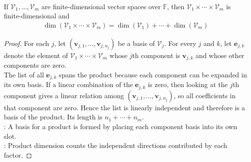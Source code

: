 \begin{theorem} \label{thm:dimension-of-product} \\
If $\mathcal{V}_1,\ldots,\mathcal{V}_m$ are finite-dimensional vector spaces over $\mathbb{F}$, then $\mathcal{V}_1\times\cdots\times\mathcal{V}_m$ is finite-dimensional and
\begin{align}
\dim(\mathcal{V}_1\times\cdots\times\mathcal{V}_m) = \dim(\mathcal{V}_1)+\cdots+\dim(\mathcal{V}_m) \nonumber
\end{align}
\begin{proof}
For each $j$, let $(\mathbf{v}_{j,1},\ldots,\mathbf{v}_{j,n_j})$ be a basis of $\mathcal{V}_j$. For every $j$ and $k$, let $\mathbf{e}_{j,k}$ denote the element of $\mathcal{V}_1\times\cdots\times\mathcal{V}_m$ whose $j$th component is $\mathbf{v}_{j,k}$ and whose other components are zero.\\
The list of all $\mathbf{e}_{j,k}$ spans the product because each component can be expanded in its own basis. If a linear combination of the $\mathbf{e}_{j,k}$ is zero, then looking at the $j$th component gives a linear relation among $(\mathbf{v}_{j,1},\ldots,\mathbf{v}_{j,n_j})$, so all coefficients in that component are zero. Hence the list is linearly independent and therefore is a basis of the product. Its length is $n_1+\cdots+n_m$.\\
: A basis for a product is formed by placing each component basis into its own slot.\\
: Product dimension counts the independent directions contributed by each factor.
\end{proof}
\end{theorem}

